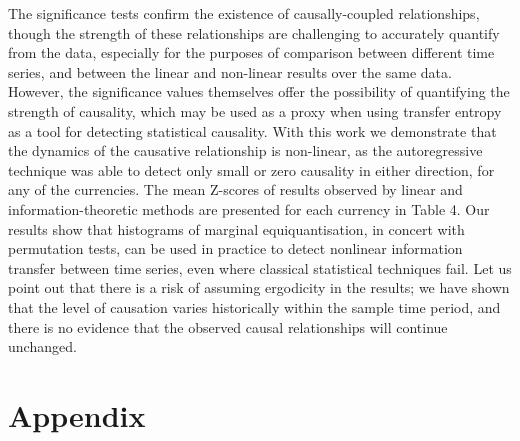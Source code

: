 \documentclass[]{rsos}%
\begin{document}
{The significance tests confirm the existence of causally-coupled relationships, though the strength of these relationships are challenging to accurately quantify from the data, especially for the purposes of comparison between different time series, and between the linear and non-linear results over the same data. However, the significance values themselves offer the possibility of quantifying the strength of causality, which may be used as a proxy when using transfer entropy as a tool for detecting statistical causality. With this work we demonstrate that the dynamics of the causative relationship is non-linear, as the autoregressive technique was able to detect only small or zero causality in either direction, for any of the currencies. The mean Z-scores of results observed by linear and information-theoretic methods are presented for each currency in Table {\color{blue}4}. Our results show that histograms of marginal equiquantisation, in concert with permutation tests, can be used in practice to detect nonlinear information transfer between time series, even where classical statistical techniques fail. Let us point out that there is a risk of assuming ergodicity in the results; we have shown that the level of causation varies historically within the sample time period, and there is no evidence that the observed causal relationships will continue unchanged. 




\section{Appendix}

}
\end{document}
